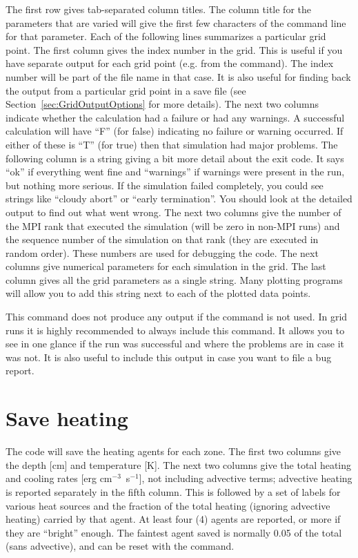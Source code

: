 The first row gives tab-separated column titles.  The column title for the parameters
that are varied will give the first few characters of the command line for
that parameter.  Each of the following lines summarizes a particular grid point.  The
first column gives the index number in the grid. This is useful if you
have separate output for each grid point (e.g. from the 
command). The index number will be part of the file name in that case. It is
also useful for finding back the output from a particular grid point in a
save file (see Section~\ref{sec:GridOutputOptions} for more details).
The next two columns indicate whether the calculation had a failure or had any
warnings.  A successful calculation will have ``F'' (for false) indicating
no failure or warning occurred.  If either of these is ``T'' (for true) then
that simulation had major problems. The following column is a string giving
a bit more detail about the exit code. It says ``ok'' if everything went fine
and ``warnings'' if warnings were present in the run, but nothing more serious.
If the simulation failed completely, you could see strings like ``cloudy abort''
or ``early termination''. You should look at the detailed output
to find out what went wrong. The next two columns give the number of the
MPI rank that executed the simulation (will be zero in non-MPI runs) and the sequence
number of the simulation on that rank (they are executed in random order). These
numbers are used for debugging the code. The next columns give numerical parameters for
each simulation in the grid.  The last column gives all the grid parameters
as a single string.  Many plotting programs will allow you to add this string
next to each of the plotted data points.

This command does not produce any output if the  command
is not used. In grid runs it is highly recommended to always include this command.
It allows you to see in one glance if the run was successful and where the problems
are in case it was not. It is also useful to include this output in case you want
to file a bug report.

\section{Save heating}

The code will save the heating agents for each zone.  The first two columns
give the depth [cm] and temperature [K].  The next two columns give the
total heating and cooling rates [erg cm$^{-3}$~s$^{-1}$], not including
advective terms; advective heating is reported separately in the fifth column.
This is followed by a set of labels for various heat sources and the fraction
of the total heating (ignoring advective heating) carried by that agent.
At least four (4) agents are reported, or more if they are ``bright'' enough.
The faintest agent saved is normally 0.05 of the total (sans advective), and
can be reset with the  command.

